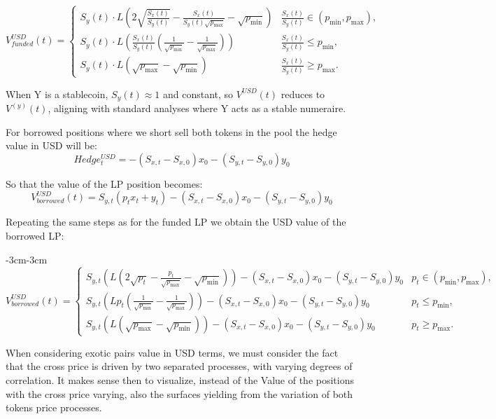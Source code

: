 \documentclass{article}
\begin{document}
\begin{equation}
V_{funded}^{USD}(t) = 
\begin{cases} 
S_y(t) \cdot L \left( 2 \sqrt{\frac{S_x(t)}{S_y(t)}} - \frac{S_x(t)}{S_y(t) \sqrt{p_{\max}}} - \sqrt{p_{\min}} \right) & \frac{S_x(t)}{S_y(t)} \in (p_{\min}, p_{\max}), \\
S_y(t) \cdot L \left( \frac{S_x(t)}{S_y(t)} \left( \frac{1}{\sqrt{p_{\min}}} - \frac{1}{\sqrt{p_{\max}}} \right) \right) & \frac{S_x(t)}{S_y(t)} \leq p_{\min}, \\
S_y(t) \cdot L \left( \sqrt{p_{\max}} - \sqrt{p_{\min}} \right) & \frac{S_x(t)}{S_y(t)} \geq p_{\max}.
\end{cases}
\label{eq:value_funded_usd}
\end{equation}

When Y is a stablecoin, \(S_y(t) \approx 1\) and constant, so \(V^{USD}(t)\) reduces to \(V^{(y)}(t)\), aligning with standard analyses where Y acts as a stable numeraire.

For borrowed positions where we short sell both tokens in the pool the hedge value in USD will be: 
$$ Hedge_t^{USD} = -(S_{x,t} - S_{x,0})x_0 - (S_{y,t} - S_{y,0})y_0 $$

So that the value of the LP position becomes:
$$V_{borrowed}^{USD}(t) = S_{y,t}(p_tx_t + y_t) -(S_{x,t} - S_{x,0})x_0 - (S_{y,t} - S_{y,0})y_0 $$

Repeating the same steps as for the funded LP we obtain the USD value of the borrowed LP:
\begin{adjustwidth}{-3cm}{-3cm}
\begin{equation}
V_{borrowed}^{USD}(t) = 
\begin{cases} 
S_{y,t}\left( L \left( 2 \sqrt{p_t} - \frac{p_t}{\sqrt{p_{\max}}} - \sqrt{p_{\min}} \right)\right) -(S_{x,t} - S_{x,0})x_0 - (S_{y,t} - S_{y,0})y_0  & p_t \in (p_{\min}, p_{\max}), \\
S_{y,t}\left( L p_t \left( \frac{1}{\sqrt{p_{\min}}} - \frac{1}{\sqrt{p_{\max}}} \right)\right)  -(S_{x,t} - S_{x,0})x_0 - (S_{y,t} - S_{y,0})y_0  & p_t \leq p_{\min}, \\
S_{y,t} \left( L \left( \sqrt{p_{\max}} - \sqrt{p_{\min}} \right) \right)-(S_{x,t} - S_{x,0})x_0 - (S_{y,t} - S_{y,0})y_0 & p_t \geq p_{\max}.
\end{cases}
\label{eq:value_borrowed_usd}
\end{equation}
\end{adjustwidth}
When considering exotic pairs value in USD terms, we must consider the fact that the cross price is driven by two separated processes, with varying degrees of correlation. It makes sense then to visualize, instead of the Value of the positions with the cross price varying, also the surfaces yielding from the variation of both tokens price processes.
\end{document}
